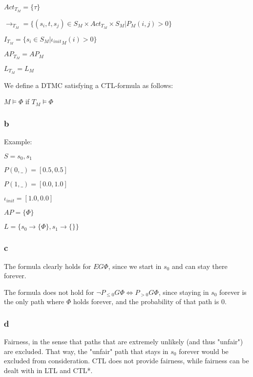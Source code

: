 $Act_{T_M} = \{\tau\}$

$\to_{T_M} = \{(s_i, t, s_j) \in S_M \times Act_{T_M} \times S_M | P_M(i, j) > 0\}$

$I_{T_M} = \{s_i \in S_M | {\iota_{init}}_M(i) > 0\}$

$AP_{T_M} = AP_M$

$L_{T_M} = L_M$

We define a DTMC satisfying a CTL-formula as follows:

$M \models \Phi$ if $T_M \models \Phi$

\subsubsection{b}

Example:

$S = {s_0, s_1}$

$P(0, \_) = [0.5, 0.5]$

$P(1, \_) = [0.0, 1.0]$

$\iota_{init} = [1.0, 0.0]$

$AP = \{\Phi\}$

$L = \{s_0 \to \{\Phi\}, s_1 \to \{\}\}$

\subsubsection{c}

The formula clearly holds for $EG \Phi$,
since we start in $s_0$ and can stay there
forever.

The formula does not hold for $\neg P_{\leq 0} G \Phi \Leftrightarrow P_{>0} G \Phi$,
since staying in $s_0$ forever is the only
path where $\Phi$ holds forever,
and the probability of that path is 0.

\subsubsection{d}

Fairness, in the sense that paths that are extremely unlikely (and thus "unfair")
are excluded.
That way, the "unfair" path that stays in $s_0$ forever would be excluded from consideration.
CTL does not provide fairness, while fairness can be dealt with in LTL and CTL*.


